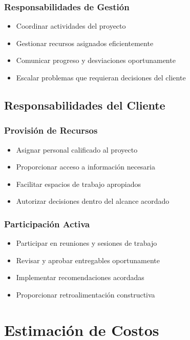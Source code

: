 \documentclass[12pt,letterpaper,oneside]{book}
\begin{document}
\subsubsection{Responsabilidades de Gestión}

\begin{itemize}
\item Coordinar actividades del proyecto
\item Gestionar recursos asignados eficientemente
\item Comunicar progreso y desviaciones oportunamente
\item Escalar problemas que requieran decisiones del cliente
\end{itemize}

\subsection{Responsabilidades del Cliente}

\subsubsection{Provisión de Recursos}

\begin{itemize}
\item Asignar personal calificado al proyecto
\item Proporcionar acceso a información necesaria
\item Facilitar espacios de trabajo apropiados
\item Autorizar decisiones dentro del alcance acordado
\end{itemize}

\subsubsection{Participación Activa}

\begin{itemize}
\item Participar en reuniones y sesiones de trabajo
\item Revisar y aprobar entregables oportunamente
\item Implementar recomendaciones acordadas
\item Proporcionar retroalimentación constructiva
\end{itemize}

\section{Estimación de Costos}
\end{document}
